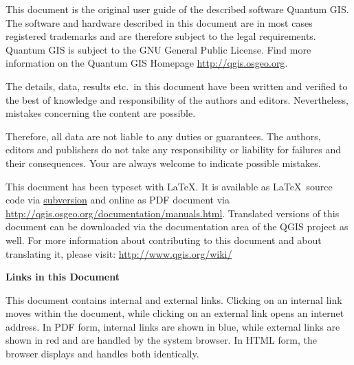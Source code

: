\frontmatter
\pagestyle{scrplain}
\vspace{1cm}


This document is the original user guide of the described 
software Quantum GIS. The software and hardware described in this 
document are in most cases registered trademarks and are therefore subject 
to the legal requirements. Quantum GIS is subject to the GNU General Public 
License. Find more information on the Quantum GIS Homepage
\url{http://qgis.osgeo.org}.
\par\bigskip
The details, data, results etc.~in this document have been 
written and verified to the best of knowledge and responsibility of the 
authors and editors. Nevertheless, mistakes concerning the content are possible.
\par\bigskip
Therefore, all data are not liable to any duties or guarantees. The authors, editors 
and publishers do not take any responsibility or liability for failures and 
their consequences. Your are always welcome to indicate possible mistakes.
\par\bigskip
This document has been typeset with \LaTeX. It is available as \LaTeX~source
code via \href{http://wiki.qgis.org/qgiswiki/DocumentationWritersCorner}{subversion} 
and online as PDF document via \url{http://qgis.osgeo.org/documentation/manuals.html}. 
Translated versions of this document can be downloaded via the documentation 
area of the QGIS project as well. For more information about contributing to
this document and about translating it, please visit: \url{http://www.qgis.org/wiki/} 

\vspace{1cm}
\noindent
\textbf{Links in this Document}
\par\bigskip
This document contains internal and external links.  Clicking on an
internal link moves within the document, while clicking on an external link
opens an internet address.  In PDF form, internal links are shown in blue,
while external links are shown in red and are handled by the
system browser. In HTML form, the browser displays and handles both
identically. 

\newpage

